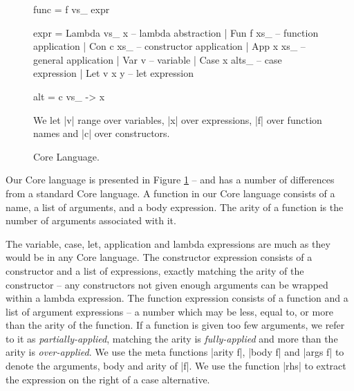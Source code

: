 \documentclass[preprint]{sigplanconf}
\begin{document}
\begin{figure}
\ignore\begin{code}
func = f vs_ expr

expr  =  Lambda vs_ x    -- lambda abstraction
      |  Fun f xs_       -- function application
      |  Con c xs_       -- constructor application
      |  App x xs_       -- general application
      |  Var v           -- variable
      |  Case x alts_    -- case expression
      |  Let v x y       -- let expression

alt = c vs_ -> x
\end{code}
\begin{comment}
\begin{code}
data Expr = Lambda [String] Expr
          | Fun String [Expr]
          | Con String [Expr]
          | App Expr [Expr]
          | Var String
          | Case Expr [Alt]
          | Let String Expr Expr

data Alt = Alt String [String] Expr

arity :: String -> Int
body :: String -> Expr
args :: String -> [String]
rhs :: Alt -> Expr
\end{code}
\end{comment}

We let |v| range over variables, |x| over expressions, |f| over function names and |c| over constructors.
\caption{Core Language.}
\label{fig:core}
\end{figure}

Our Core language is presented in Figure \ref{fig:core} -- and has a number of differences from a standard Core language. A function in our Core language consists of a name, a list of arguments, and a body expression. The arity of a function is the number of arguments associated with it.

The variable, case, let, application and lambda expressions are much as they would be in any Core language. The constructor expression consists of a constructor and a list of expressions, exactly matching the arity of the constructor -- any constructors not given enough arguments can be wrapped within a lambda expression. The function expression consists of a function and a list of argument expressions -- a number which may be less, equal to, or more than the arity of the function. If a function is given too few arguments, we refer to it as \textit{partially-applied}, matching the arity is \textit{fully-applied} and more than the arity is \textit{over-applied}. We use the meta functions |arity f|, |body f| and |args f| to denote the arguments, body and arity of |f|. We use the function |rhs| to extract the expression on the right of a case alternative.
\end{document}
